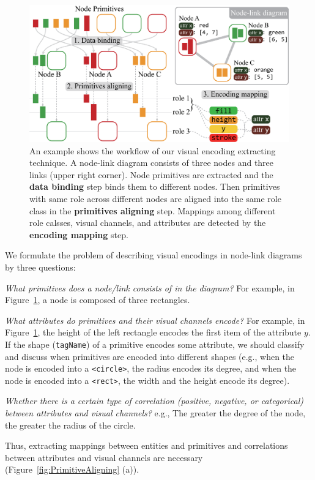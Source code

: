 \begin{figure}[ht]
    \centering
    \includegraphics[width=1\columnwidth]{figures/VisualEncodings.eps}
    \caption{An example shows the workflow of our visual encoding extracting technique. A node-link diagram consists of three nodes and three links (upper right corner). Node primitives are extracted and the \textbf {data binding} step binds them to different nodes. Then primitives with same role across different nodes are aligned into the same role class in the \textbf{primitives aligning} step. Mappings among different role calsses, visual channels, and attributes are detected by the \textbf{encoding mapping} step.}
    \label{fig:VisualEncodings}
\end{figure}

We formulate the problem of describing visual encodings in node-link diagrams by three questions:
\begin{compactenum}[\textbf{Q}1]
    \item \textit{What primitives does a node/link consists of in the diagram?} For example, in Figure~\ref{fig:VisualEncodings}, a node is composed of three rectangles. \label{qstn:composition}
    
    \item \textit{What attributes do primitives and their visual channels encode?} For example, in Figure~\ref{fig:VisualEncodings}, the height of the left rectangle encodes the first item of the attribute $y$. If the shape (\texttt{tagName}) of a primitive encodes some attribute, we should classify and discuss when primitives are encoded into different shapes (e.g., when the node is encoded into a \texttt{<circle>}, the radius encodes its degree, and when the node is encoded into a \texttt{<rect>}, the width and the height encode its degree). \label{qstn:encodings}
    
    \item \textit{Whether there is a certain type of correlation (positive, negative, or categorical) between attributes and visual channels?} e.g., The greater the degree of the node, the greater the radius of the circle.\label{qstn:correlation}
\end{compactenum}
Thus, extracting mappings between entities and primitives and correlations between attributes and visual channels are necessary (Figure~\ref{fig:PrimitiveAligning} (a)).


